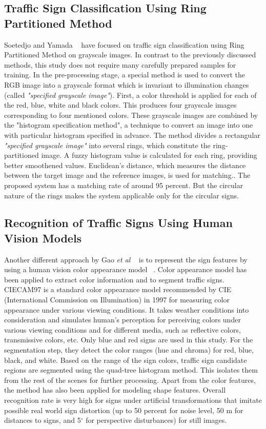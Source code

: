 \documentclass[review,number]{elsarticle}
\begin{document}
\subsection{Traffic Sign Classification Using Ring Partitioned Method}
Soetedjo and Yamada ~\cite{signbib11} have focused on traffic sign classification using Ring Partitioned Method on grayscale images. In contrast to the previously discussed methods, this study does not require many carefully prepared samples for training. In the pre-processing stage, a special method is used to convert the RGB image into a grayscale format which is invariant to illumination changes (called \textit{"specified grayscale image"}). First, a color threshold is applied for each of the red, blue, white and black colors. This produces four grayscale images corresponding to four mentioned colors. These grayscale images are combined by the "histogram specification method", a technique to convert an image into one with particular histogram specified in advance. The method divides a rectangular \textit{"specified grayscale image"} into several rings, which constitute the ring-partitioned image. A fuzzy histogram value is calculated for each ring, providing better smoothened values. Euclidean's distance, which measures the distance between the target image and the reference images, is used for matching.. The proposed system has a matching rate of around 95 percent. But the circular nature of the rings makes the system applicable only for the circular signs.

\subsection{Recognition of Traffic Signs Using Human Vision Models}
Another different approach by Gao \textit{et al} ~\cite{Gao2006} is to represent the sign features by using a human vision color appearance model ~\cite{signbib25}. Color appearance model has been applied to extract color information and to segment traffic signs. CIECAM97 is a standard color appearance model recommended by CIE (International Commission on Illumination) in 1997 for measuring color appearance under various viewing conditions. It takes weather conditions into consideration and simulates human's perception for perceiving colors under various viewing conditions and for different media, such as reflective colors, transmissive colors, etc. Only blue and red signs are used in this study. For the segmentation step, they detect the color ranges (hue and chroma) for red, blue, black, and white. Based on the range of the sign colors, traffic sign candidate regions are segmented using the quad-tree histogram method. This isolates them from the rest of the scenes for further processing. Apart from the color features, the method has also been applied for modeling shape features. Overall recognition rate is very high for signs under artificial transformations that imitate possible real world sign distortion (up to 50 percent for noise level, 50 m for distances to signs, and 5$^{\circ}$ for perspective disturbances) for still images. 
\end{document}
